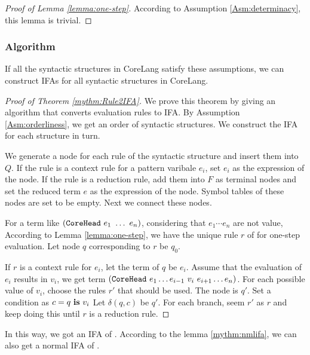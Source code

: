 \begin{proof}[Proof of Lemma \ref{lemma:one-step}]
According to Assumption \ref{Asm:determinacy}, this lemma is trivial.
\end{proof}

\subsubsection{Algorithm}

\begin{mythm}
\label{mythm:Rule2IFA}
If all the syntactic structures in CoreLang satisfy these assumptions, we can construct IFAs for all syntactic structures in CoreLang.
\end{mythm}

\begin{proof}[Proof of Theorem \ref{mythm:Rule2IFA}]

We prove this theorem by giving an algorithm that converts evaluation rules to IFA. By Assumption \ref{Asm:orderliness}, we get an order of syntactic structures. We construct the IFA for each structure in turn.

We generate a node for each rule of the syntactic structure  and insert them into $Q$. If the rule is a context rule for a pattern varibale $e_i$, set $e_i$ as the expression of the node. If the rule is a reduction rule, add them into $F$ as terminal nodes and set the reduced term $e$ as the expression of the node. Symbol tables of these nodes are set to be empty. Next we connect these nodes.

For a term like $(\mbox{\tt CoreHead}~e_1~\ldots~e_n)$, considering that $e_1\cdots e_n$ are not value, According to Lemma \ref{lemma:one-step}, we have the unique rule $r$ of  for one-step evaluation. Let node $q$ corresponding to $r$ be $q_0$.

If $r$ is a context rule for $e_i$, let the term of $q$ be $e_i$. Assume that the evaluation of $e_i$ results in $v_i$, we get term $(\mbox{\tt CoreHead}~e_1 \ldots e_{i-1}~v_i~e_{i+1} \ldots e_n)$. For each possible value of $v_i$, choose the rules $r'$ that should be used. The node is $q'$. Set a condition as $c=q~\mbox{\rm \bf is}~v_i$ Let $\delta(q, c)$ be $q'$. For each branch, seem $r'$ as $r$ and keep doing this until $r$ is a reduction rule.
\end{proof}

In this way, we got an IFA of . According to the lemma \ref{mythm:nmlifa}, we can also get a normal IFA of .

